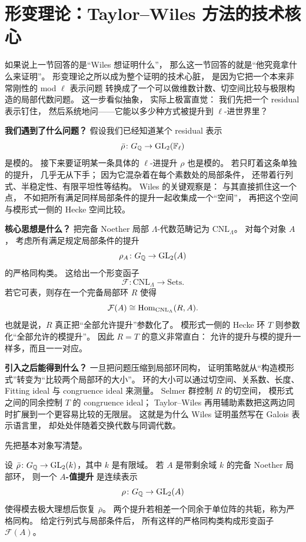 \section{形变理论：Taylor--Wiles 方法的技术核心}
\label{sec:ch10-deformation}

\providecommand{\rhobar}{\bar{\rho}}

如果说上一节回答的是“Wiles 想证明什么”，
那么这一节回答的就是“他究竟拿什么来证明”。
形变理论之所以成为整个证明的技术心脏，
是因为它把一个本来非常刚性的 mod $\ell$ 表示问题
转换成了一个可以做维数计数、切空间比较与极限构造的局部代数问题。
这一步看似抽象，
实际上极富直觉：
我们先把一个 residual 表示钉住，
然后系统地问——它能以多少种方式被提升到 $\ell$-进世界里？

\textbf{我们遇到了什么问题？}
假设我们已经知道某个 residual 表示
\[
  \rhobar\colon G_\Q\to \GL_2(\F_\ell)
\]
是模的。
接下来要证明某一条具体的 $\ell$-进提升 $\rho$ 也是模的。
若只盯着这条单独的提升，
几乎无从下手；
因为它混杂着在每个素数处的局部条件，
还带着行列式、半稳定性、有限平坦性等结构。
Wiles 的关键观察是：
与其直接抓住这一个点，
不如把所有满足同样局部条件的提升一起收集成一个“空间”，
再把这个空间与模形式一侧的 Hecke 空间比较。

\textbf{核心思想是什么？}
把完备 Noether 局部 $\Lambda$-代数范畴记为 $\mathrm{CNL}_\Lambda$。
对每个对象 $A$，
考虑所有满足规定局部条件的提升
\[
  \rho_A\colon G_{\mathbb{Q}}\to \mathrm{GL}_2(A)
\]
的严格同构类。
这给出一个形变函子
\[
  \mathcal F\colon \mathrm{CNL}_\Lambda\to \mathrm{Sets}.
\]
若它可表，则存在一个完备局部环 $R$ 使得
\[
  \mathcal F(A)\cong \mathrm{Hom}_{\mathrm{CNL}_\Lambda}(R,A).
\]
也就是说，$R$ 真正把“全部允许提升”参数化了。
模形式一侧的 Hecke 环 $T$ 则参数化“全部允许的模提升”。
因此 $R=T$ 的意义非常直白：
允许的提升与模的提升一样多，而且一一对应。

\textbf{引入之后能得到什么？}
一旦把问题压缩到局部环同构，
证明策略就从“构造模形式”转变为“比较两个局部环的大小”。
环的大小可以通过切空间、关系数、长度、Fitting ideal 与 congruence ideal 来测量。
Selmer 群控制 $R$ 的切空间，
模形式之间的同余控制 $T$ 的 congruence ideal；
Taylor--Wiles 再用辅助素数把这两边同时扩展到一个更容易比较的无限层。
这就是为什么 Wiles 证明虽然写在 Galois 表示语言里，
却处处伴随着交换代数与同调代数。



先把基本对象写清楚。

\begin{definition}[形变问题]
设 $\rhobar\colon G_\Q\to \GL_2(k)$，其中 $k$ 是有限域。
若 $A$ 是带剩余域 $k$ 的完备 Noether 局部环，
则一个 \textbf{$A$-值提升} 是连续表示
\[
  \rho\colon G_{\mathbb{Q}}\to \mathrm{GL}_2(A)
\]
使得模去极大理想后恢复 $\rhobar$。
两个提升若相差一个同余于单位阵的共轭，称为严格同构。
给定行列式与局部条件后，
所有这样的严格同构类构成形变函子 $\mathcal F(A)$。
\end{definition}


